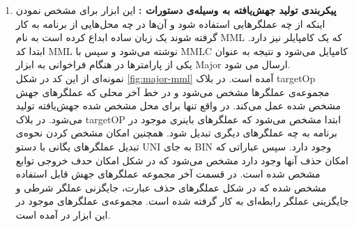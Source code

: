 \begin{enumerate}
\item

\textbf{پیکربندی تولید جهش‌یافته به وسیله‌ی دستورات : }
این ابزار برای مشخص نمودن اینکه از چه عملگرهایی استفاده شود و آن‌ها در چه محل‌هایی از برنامه به کار گرفته شوند یک زبان ساده ابداع کرده است به نام MML که یک کامپایلر نیز دارد. ابتدا کد MML نوشته می‌شود و سپس با MMLC کامپایل می‌شود و نتیجه به عنوان یکی از پارامترها  در هنگام فراخوانی به ابزار  Major ارسال می شود. \\

نمونه‌ای از این کد در شکل \ref{fig:major-mml} آمده است. در بلاک targetOp مجموعه‌ی عملگرها مشخص می‌شود و در خط آخر محلی که عملگرهای جهش مشخص شده عمل می‌کند. در واقع تنها برای محل مشخص شده جهش‌یافته تولید می‌شود. در بلاک targetOP ابتدا مشخص می‌شود که عملگرهای باینری موجود در برنامه به چه عملگرهای دیگری تبدیل شود. همچنین امکان مشخص کردن نحوه‌ی تبدیل عملگرهای یگانی با دستو UNI به جای BIN وجود دارد. سپس عباراتی که امکان حذف آنها وجود دارد مشخص می‌شود که در شکل امکان حدف خروجی توابع مشخص شده است. در قسمت آخر مجموعه عملگرهای جهش قابل استفاده مشخص شده که در شکل عملگرهای حذف عبارت، جایگزنی عملگر شرطی و جایگزینی عملگر رابطه‌ای به کار گرفته شده است. مجموعه‌ی عملگرهای موجود در این ابزار در \cite{just2014major} آمده است. 


\end{enumerate}
